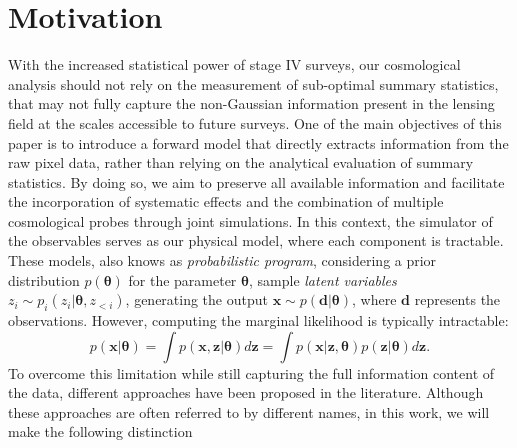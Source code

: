 \documentclass{aa}
\begin{document}
\section{Motivation}\label{Sec:Motivation}
With the increased statistical power of stage IV surveys, our cosmological analysis should not rely on the measurement of sub-optimal summary statistics, that may not fully capture the non-Gaussian information present in the lensing field at the scales accessible to future surveys. One of the main objectives of this paper is to introduce a forward model that directly extracts information from the raw pixel data, rather than relying on the analytical evaluation of summary statistics. By doing so, we aim to preserve all available information and facilitate the incorporation of systematic effects and the combination of multiple cosmological probes through joint simulations.
In this context, the simulator of the observables serves as our physical model, where each component is tractable. These models, also knows as \textit{probabilistic program}, considering a prior distribution $p(\bm{\theta})$ for the parameter $\bm{\theta}$, sample \textit{latent variables} $z_i \sim p_i(z_i|\bm \theta, z_{<i})$, generating the output $\bm x \sim p(\bm d|\bm \theta)$, where $\bm{d}$ represents the observations. However, computing the marginal likelihood is typically intractable:
\begin{equation}
    p(\bm{x}|\bm{\theta})=\int p(\bm{x},\bm{z}|\bm{\theta}) d\bm{z}=\int p(\bm{x}|\bm{z},\bm{\theta})p(\bm{z}|\bm{\theta}) d\bm{z}.
\end{equation}
To overcome this limitation while still capturing the full information content of the data, different approaches have been proposed in the literature. Although these approaches are often referred to by different names, in this work, we will make the following distinction
\end{document}
